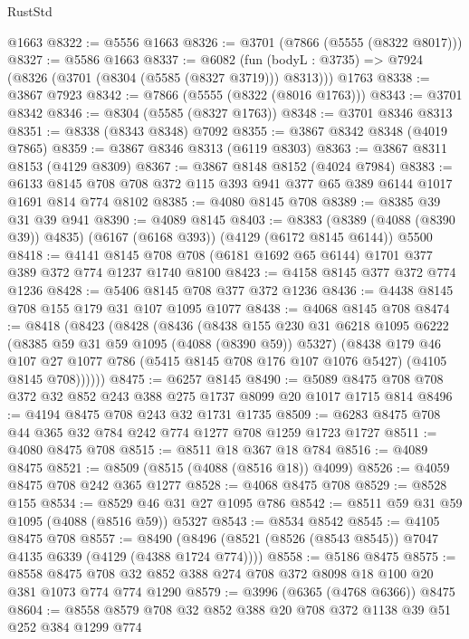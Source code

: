 \begin{lexlean}{RustStd}
\begin{coremodule}
    @1663
@8322 := @5556 @1663
@8326 := @3701 (@7866 (@5555 (@8322 @8017)))
@8327 := @5586 @1663
@8337 := @6082
    (fun (bodyL : @3735) => @7924 (@8326 (@3701 (@8304 (@5585 (@8327 @3719))) @8313)))
    @1763
@8338 := @3867 @7923
@8342 := @7866 (@5555 (@8322 (@8016 @1763)))
@8343 := @3701 @8342
@8346 := @8304 (@5585 (@8327 @1763))
@8348 := @3701 @8346 @8313
@8351 := @8338 (@8343 @8348) @7092
@8355 := @3867 @8342 @8348 (@4019 @7865)
@8359 := @3867 @8346 @8313 (@6119 @8303)
@8363 := @3867 @8311 @8153 (@4129 @8309)
@8367 := @3867 @8148 @8152 (@4024 @7984)
@8383 := @6133 @8145 @708 @708 @372 @115 @393 @941 @377 @65 @389 @6144 @1017 @1691 @814 @774 @8102
@8385 := @4080 @8145 @708
@8389 := @8385 @39 @31 @39 @941
@8390 := @4089 @8145
@8403 := @8383
    (@8389 (@4088 (@8390 @39)) @4835)
    (@6167 (@6168 @393))
    (@4129 (@6172 @8145 @6144))
    @5500
@8418 := @4141 @8145 @708 @708 (@6181 @1692 @65 @6144) @1701 @377 @389 @372 @774 @1237 @1740 @8100
@8423 := @4158 @8145 @377 @372 @774 @1236
@8428 := @5406 @8145 @708 @377 @372 @1236
@8436 := @4438 @8145 @708 @155 @179 @31 @107 @1095 @1077
@8438 := @4068 @8145 @708
@8474 := @8418
    (@8423
      (@8428
        (@8436
          (@8438
            @155
            @230
            @31
            @6218
            @1095
            @6222
            (@8385 @59 @31 @59 @1095 (@4088 (@8390 @59)) @5327)
            (@8438
              @179
              @46
              @107
              @27
              @1077
              @786
              (@5415 @8145 @708 @176 @107 @1076 @5427)
              (@4105 @8145 @708))))))
@8475 := @6257 @8145
@8490 := @5089 @8475 @708 @708 @372 @32 @852 @243 @388 @275 @1737 @8099 @20 @1017 @1715 @814
@8496 := @4194 @8475 @708 @243 @32 @1731 @1735
@8509 := @6283 @8475 @708 @44 @365 @32 @784 @242 @774 @1277 @708 @1259 @1723 @1727
@8511 := @4080 @8475 @708
@8515 := @8511 @18 @367 @18 @784
@8516 := @4089 @8475
@8521 := @8509 (@8515 (@4088 (@8516 @18)) @4099)
@8526 := @4059 @8475 @708 @242 @365 @1277
@8528 := @4068 @8475 @708
@8529 := @8528 @155
@8534 := @8529 @46 @31 @27 @1095 @786
@8542 := @8511 @59 @31 @59 @1095 (@4088 (@8516 @59)) @5327
@8543 := @8534 @8542
@8545 := @4105 @8475 @708
@8557 := @8490 (@8496 (@8521 (@8526 (@8543 @8545)) @7047 @4135 @6339 (@4129 (@4388 @1724 @774))))
@8558 := @5186 @8475
@8575 := @8558 @8475 @708 @32 @852 @388 @274 @708 @372 @8098 @18 @100 @20 @381 @1073 @774 @774 @1290
@8579 := @3996 (@6365 (@4768 @6366)) @8475
@8604 := @8558
    @8579
    @708
    @32
    @852
    @388
    @20
    @708
    @372
    @1138
    @39
    @51
    @252
    @384
    @1299
    @774

\end{coremodule}
\end{lexlean}
